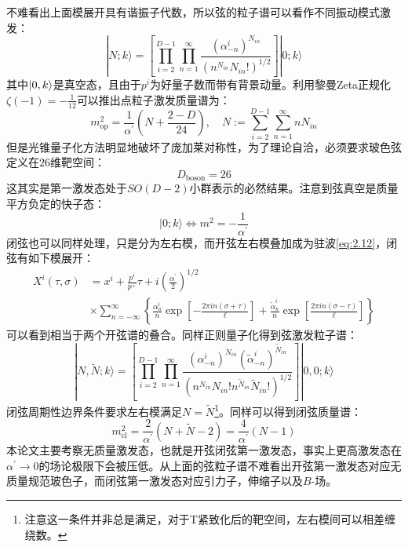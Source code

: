 不难看出上面模展开具有谐振子代数，所以弦的粒子谱可以看作不同振动模式激发：
\begin{equation}
	|N;k\rangle=\left[\prod_{i=2}^{D-1}\prod_{n=1}^\infty\frac{(\alpha_{-n}^i)^{N_{in}}}{(n^{N_{in}}N_{in}!)^{1/2}}\right]|0;k\rangle
\end{equation}
其中$\ket{0,k}$是真空态，且由于$p^i$为好量子数而带有背景动量。利用黎曼Zeta正规化$\zeta(-1)=-\frac{1}{12}$可以推出点粒子激发质量谱为：
\begin{equation}
	m^2_\mathrm{op}=\frac{1}{\alpha^{\prime}}\left(N+\frac{2-D}{24}\right),\quad N:=\sum_{i=2}^{D-1}\sum_{n=1}^{\infty}nN_{in}
\end{equation}
但是光锥量子化方法明显地破坏了庞加莱对称性，为了理论自洽，必须要求玻色弦定义在$26$维靶空间：
\begin{equation}
	\boxed{
		D_{\text{boson}}=26
	}
\end{equation}
这其实是第一激发态处于$SO(D-2)$小群表示的必然结果。注意到弦真空是质量平方负定的快子态：
\begin{equation}
	|0;k\rangle\Leftrightarrow m^2=-\frac{1}{\alpha^\prime}
\end{equation}
闭弦也可以同样处理，只是分为左右模，而开弦左右模叠加成为驻波\ref{eq:2.12}，闭弦有如下模展开：
\begin{equation}
	\label{eq:2.19}
	\begin{aligned}X^i(\tau,\sigma)&=x^i+\frac{p^i}{p^+}\tau+i\left(\frac{\alpha^{\prime}}{2}\right)^{1/2}\\&\times\sum_{n=-\infty}^\infty\left\{\frac{\alpha_n^i}{n}\exp\left[-\frac{2\pi in(\sigma+\tau)}{\ell}\right]+\frac{\tilde{\alpha}_n^i}{n}\exp\left[\frac{2\pi in(\sigma-\tau)}{\ell}\right]\right\}\end{aligned}
\end{equation}
可以看到相当于两个开弦谱的叠合。同样正则量子化得到弦激发粒子谱：
\begin{equation}
	|N,\tilde{N};k\rangle=\left[\prod_{i=2}^{D-1}\prod_{n=1}^\infty\frac{(\alpha_{-n}^i)^{N_{in}}(\tilde{\alpha}_{-n}^i)^{\tilde{N}_{in}}}{(n^{N_{in}}N_{in}!n^{\tilde{N}_{in}}\tilde{N}_{in}!)^{1/2}}\right]|0,0;k\rangle
\end{equation}
闭弦周期性边界条件要求左右模满足$N=\tilde{N}$\footnote{注意这一条件并非总是满足，对于T紧致化后的靶空间，左右模间可以相差缠绕数。}。同样可以得到闭弦质量谱：
\begin{equation}
	m^2_{\mathrm{cl}}=\frac{2}{\alpha^\prime}(N+\tilde{N}-2)=\frac{4}{\alpha^\prime}(N-1)
\end{equation}
本论文主要考察无质量激发态，也就是开弦闭弦第一激发态，事实上更高激发态在$\alpha^\prime\to0$的场论极限下会被压低。从上面的弦粒子谱不难看出开弦第一激发态对应无质量规范玻色子，而闭弦第一激发态对应引力子，伸缩子以及$B$-场。
